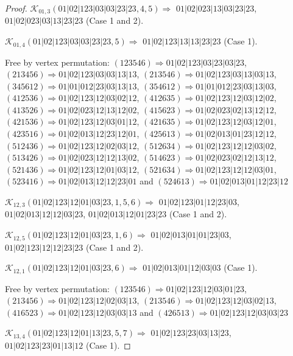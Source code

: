 \documentclass[12pt]{article}
\theoremstyle{plain}
\theoremstyle{definition}
\theoremstyle{remark}
\newcommand{\fancy}[1]{\mathcal{#1}}
\def\K{\fancy{K}}
\begin{document}
\begin{proof}
	
	
	\bigskip
	
	$\K_{01,3}(01|02|123|03|03|23|23,4, 5)\Rightarrow $ $01|02|023|13|03|23|23$, $01|02|023|03|13|23|23$ (Case 1 and 2).
	
	$\K_{01,4}(01|02|123|03|03|23|23,5)\Rightarrow $ $01|02|123|13|13|23|23$ (Case 1).
	
	
	
	Free by vertex permutation: $(1 2 3 5 4 6)\Rightarrow 01|02|123|03|23|03|23$, $(2 1 3 4 5 6)\Rightarrow 01|02|123|03|03|13|13$, $(2 1 3 5 4 6)\Rightarrow 01|02|123|03|13|03|13$, $(3 4 5 6 1 2)\Rightarrow 01|01|012|23|03|13|13$, $(3 5 4 6 1 2)\Rightarrow 01|01|012|23|03|13|03$, $(4 1 2 5 3 6)\Rightarrow 01|02|123|12|03|02|12$, $(4 1 2 6 3 5)\Rightarrow 01|02|123|12|03|12|02$, $(4 1 3 5 2 6)\Rightarrow 01|02|023|12|13|12|02$, $(4 1 5 6 2 3)\Rightarrow 01|02|023|02|13|12|12$, $(4 2 1 5 3 6)\Rightarrow 01|02|123|12|03|01|12$, $(4 2 1 6 3 5)\Rightarrow 01|02|123|12|03|12|01$, $(4 2 3 5 1 6)\Rightarrow 01|02|013|12|23|12|01$, $(4 2 5 6 1 3)\Rightarrow 01|02|013|01|23|12|12$, $(5 1 2 4 3 6)\Rightarrow 01|02|123|12|02|03|12$, $(5 1 2 6 3 4)\Rightarrow 01|02|123|12|12|03|02$, $(5 1 3 4 2 6)\Rightarrow 01|02|023|12|12|13|02$, $(5 1 4 6 2 3)\Rightarrow 01|02|023|02|12|13|12$, $(5 2 1 4 3 6)\Rightarrow 01|02|123|12|01|03|12$, $(5 2 1 6 3 4)\Rightarrow 01|02|123|12|12|03|01$, $(5 2 3 4 1 6)\Rightarrow 01|02|013|12|12|23|01$ and $(5 2 4 6 1 3)\Rightarrow 01|02|013|01|12|23|12$
	
	
	
	\bigskip
	
	$\K_{12,3}(01|02|123|12|01|03|23,1, 5, 6)\Rightarrow $ $01|02|123|01|12|23|03$, $01|02|013|12|12|03|23$, $01|02|013|12|01|23|23$ (Case 1 and 2).
	
	$\K_{12,5}(01|02|123|12|01|03|23,1, 6)\Rightarrow $ $01|02|013|01|01|23|03$, $01|02|123|12|12|23|23$ (Case 1 and 2).
	
	$\K_{12,1}(01|02|123|12|01|03|23,6)\Rightarrow $ $01|02|013|01|12|03|03$ (Case 1).
	
	
	
	Free by vertex permutation: $(1 2 3 5 4 6)\Rightarrow 01|02|123|12|03|01|23$, $(2 1 3 4 5 6)\Rightarrow 01|02|123|12|02|03|13$, $(2 1 3 5 4 6)\Rightarrow 01|02|123|12|03|02|13$, $(4 1 6 5 2 3)\Rightarrow 01|02|123|12|03|03|13$ and $(4 2 6 5 1 3)\Rightarrow 01|02|123|12|03|03|23$
	
	
	
	\bigskip
	
	$\K_{13,4}(01|02|123|12|01|13|23,5, 7)\Rightarrow $ $01|02|123|23|03|13|23$, $01|02|123|23|01|13|12$ (Case 1).
	

\end{proof}
\end{document}
